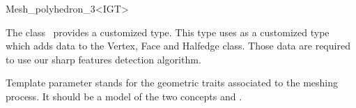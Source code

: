 \ccRefPageBegin


\begin{ccRefClass}{Mesh_polyhedron_3<IGT>}  %


\ccDefinition
  
The class \ccRefName\ provides a customized  type. This type uses
as  a customized type which adds data to the Vertex, Face and
Halfedge class. Those data are required to use our sharp features
detection algorithm.


\ccParameters

Template parameter  stands for the geometric traits associated
to the meshing process. It should be a model of the two concepts
 and .

\ccTypes


\ccSeeAlso


\end{ccRefClass}

\ccRefPageEnd

